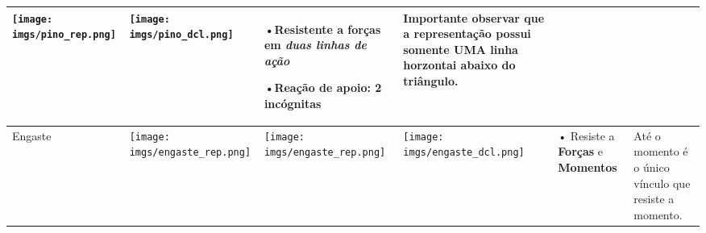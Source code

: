 \documentclass{article}
\begin{document}
\begin{table}[h]
\begin{tabularx}{\textwidth}{|l|X|X|X|l|l|}
        \begin{minipage}{.2\columnwidth}
            \centering
            \texttt{[image: imgs/pino\_rep.png]}
        \end{minipage}     &

        \begin{minipage}{.2\columnwidth}
            \centering
            \texttt{[image: imgs/pino\_dcl.png]}
        \end{minipage}     &

        \begin{minipage}{.1\columnwidth}
            \tiny
            •Resistente a forças em \emph{duas linhas de ação}

            •Reação de apoio: 2 incógnitas
        \end{minipage}          &

        \begin{minipage}{.1\columnwidth}
            \vspace{5px}
            \tiny
            Importante observar que a representação possui somente \textbf{UMA} linha horzontai abaixo do triângulo.
            \vspace{5px}
        \end{minipage}                                                            \\ \hline


        Engaste                                                     &

        \begin{minipage}{.2\textwidth}
            \centering
            \texttt{[image: imgs/engaste\_rep.png]}
        \end{minipage}  &

        \begin{minipage}{.2\columnwidth}
            \centering
            \texttt{[image: imgs/engaste\_rep.png]}
        \end{minipage}  &

        \begin{minipage}{.2\columnwidth}
            \centering
            \texttt{[image: imgs/engaste\_dcl.png]}
        \end{minipage}  &

        \begin{minipage}{.1\columnwidth}
            \tiny
            • Resiste a \textbf{Forças} e \textbf{Momentos}
        \end{minipage}             &

        \begin{minipage}{.1\columnwidth}
            \vspace{5px}
            \tiny
            Até o momento é o único vínculo que resiste a momento.
            \vspace{5px}
        \end{minipage}                                                                                                              \\ \hline
    \end{tabularx}
\end{table}
\end{document}
